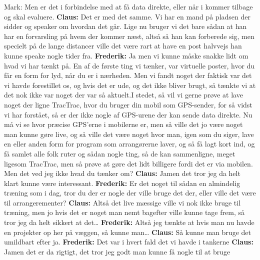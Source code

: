 Mark: Men er det i forbindelse med at få data direkte, eller når i kommer tilbage og skal evaluere.\newline
\textbf{Claus:} Det er med det samme. Vi har en mand på pladsen der sidder og speaker om hvordan det går. Lige nu bruger vi det bare sådan at han har en forvarsling på hvem der kommer næst, altså så han kan forberede sig, men specielt på de lange distancer ville det være rart at have en post halvvejs han kunne speake nogle tider fra.\newline
\textbf{Frederik:} Ja men vi kunne måske snakke lidt om hvad vi har tænkt på. 
En af de første ting vi tænker, var virtuelle poster, hvor du får en form for lyd, når du er i nærheden. Men vi fandt noget der faktisk var det vi havde forestillet os, og hvis det er ude, og det ikke bliver brugt, så tænkte vi at det nok ikke var noget der var så aktuelt.I stedet, så vil vi gerne prøve at lave noget der ligne TracTrac, hvor du bruger din mobil som GPS-sender, for så vidst vi har forstået, så er der ikke nogle af GPS-urene der kan sende data direkte. Nu må vi se hvor præcise GPS’erne i mobilerne er, men så ville det jo være noget man kunne gøre live, og så ville det være noget hvor man, igen som du siger, lave en eller anden form for program som arrangørerne laver, og så få lagt kort ind, og få samlet alle folk ruter og sådan nogle ting, så de kan sammenligne, meget ligesom TracTrac, men så prøve at gøre det lidt billigere fordi det er via mobilen. Men det ved jeg ikke hvad du tænker om?\newline
\textbf{Claus:} Jamen det tror jeg da helt klart kunne være interessant.\newline
\textbf{Frederik:} Er det noget til sådan en almindelig træning som i dag, tror du der er nogle der ville bruge det der, eller ville det være til arrangerementer?\newline
\textbf{Claus:} Altså det live mæssige ville vi nok ikke bruge til træning, men jo hvis det er noget man nemt bagefter ville kunne tage frem, så tror jeg da helt sikkert at det… \newline
\textbf{Frederik:} Altså jeg tænkte at hvis man nu havde en projekter op her på væggen, så kunne man…\newline
\textbf{Claus:}  Så kunne man bruge det umildbart efter ja.\newline
\textbf{Frederik:} Det var i hvert fald det vi havde i tankerne\newline
\textbf{Claus:} Jamen det er da rigtigt, det tror jeg godt man kunne få nogle til at bruge\newline
